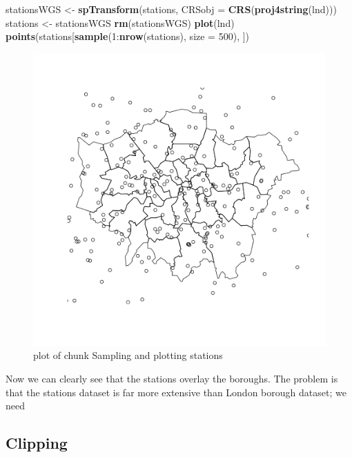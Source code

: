 \documentclass[]{article}
\makeatletter
\newenvironment{Shaded}{}{}
\newcommand{\KeywordTok}[1]{\textcolor[rgb]{0.00,0.44,0.13}{\textbf{{#1}}}}
\newcommand{\DataTypeTok}[1]{\textcolor[rgb]{0.56,0.13,0.00}{{#1}}}
\newcommand{\DecValTok}[1]{\textcolor[rgb]{0.25,0.63,0.44}{{#1}}}
\newcommand{\NormalTok}[1]{{#1}}
\def\maxwidth{\ifdim\Gin@nat@width>\linewidth\linewidth
\else\Gin@nat@width\fi}
\let\Oldincludegraphics\includegraphics
\renewcommand{\includegraphics}[1]{\Oldincludegraphics[width=\maxwidth]{#1}}
\makeatother
\begin{document}
\begin{Shaded}
\begin{Highlighting}[]
\NormalTok{stationsWGS <- }\KeywordTok{spTransform}\NormalTok{(stations, }\DataTypeTok{CRSobj =} \KeywordTok{CRS}\NormalTok{(}\KeywordTok{proj4string}\NormalTok{(lnd)))}
\NormalTok{stations <- stationsWGS}
\KeywordTok{rm}\NormalTok{(stationsWGS)}
\KeywordTok{plot}\NormalTok{(lnd)}
\KeywordTok{points}\NormalTok{(stations[}\KeywordTok{sample}\NormalTok{(}\DecValTok{1}\NormalTok{:}\KeywordTok{nrow}\NormalTok{(stations), }\DataTypeTok{size =} \DecValTok{500}\NormalTok{), ])}
\end{Highlighting}
\end{Shaded}
\begin{figure}[htbp]
\centering
\includegraphics{figure/Sampling_and_plotting_stations.png}
\caption{plot of chunk Sampling and plotting stations}
\end{figure}

Now we can clearly see that the stations overlay the boroughs. The
problem is that the stations dataset is far more extensive than London
borough dataset; we need

\subsection{Clipping}
\end{document}
